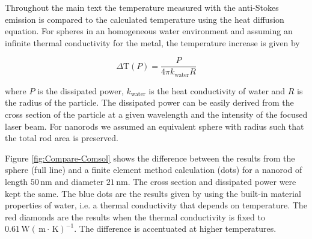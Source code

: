 \documentclass[journal=nalefd,manuscript=letter]{achemso}
\newcommand{\K}{\ensuremath{\,\textrm{K}}}
\newcommand{\nm}{\ensuremath{\,\textrm{nm}}}
\newcommand{\m}{\ensuremath{\,\textrm{m}}}
\newcommand{\W}{\ensuremath{\,\textrm{W}}}
\begin{document}
Throughout the main text the temperature measured with the anti-Stokes emission
is compared to the calculated temperature using the heat diffusion
equation. For spheres in an homogeneous water environment and assuming an infinite
thermal conductivity for the metal, the temperature increase is given by

\begin{equation}
	\Delta \textrm{T}(P) = \frac{P}{4\pi k_{\textrm{water}} R}
\end{equation}

\noindent where $P$ is the dissipated power, $k_{\textrm{water}}$ is the heat
conductivity of water and $R$ is the radius of the particle.\cite{Baffou2013} 
The dissipated power can be
easily derived from the cross section of the particle at a given wavelength and
the intensity of the focused laser beam. For nanorods we assumed an
equivalent sphere with radius such that the total rod area is preserved.

Figure \ref{fig:Compare-Comsol} shows the difference between the results from
the sphere (full line) and a finite element method calculation
(dots) for a nanorod of length $50\nm$ and diameter $21\nm$. The cross section
and dissipated power were kept the same. The blue dots are the results given
by using the built-in material properties of water, i.e. a thermal conductivity
that depends on temperature. The red diamonds are the results when the thermal
conductivity is fixed to $0.61 \W(\m\cdot\K)^{-1}$. The difference is
accentuated at higher temperatures.


 
\end{document}
